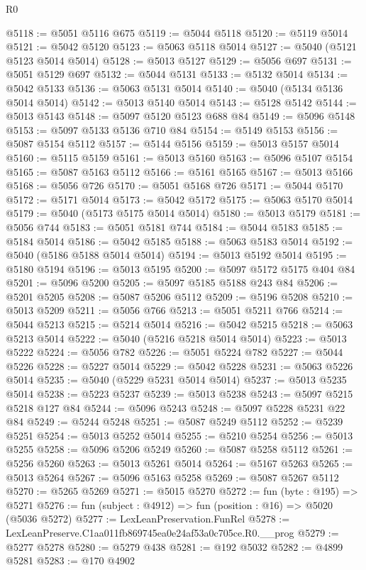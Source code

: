 \begin{lexlean}{R0}
\begin{coremodule}
@5118 := @5051 @5116 @675
@5119 := @5044 @5118
@5120 := @5119 @5014
@5121 := @5042 @5120
@5123 := @5063 @5118 @5014
@5127 := @5040 (@5121 @5123 @5014 @5014)
@5128 := @5013 @5127
@5129 := @5056 @697
@5131 := @5051 @5129 @697
@5132 := @5044 @5131
@5133 := @5132 @5014
@5134 := @5042 @5133
@5136 := @5063 @5131 @5014
@5140 := @5040 (@5134 @5136 @5014 @5014)
@5142 := @5013 @5140 @5014
@5143 := @5128 @5142
@5144 := @5013 @5143
@5148 := @5097 @5120 @5123 @688 @84
@5149 := @5096 @5148
@5153 := @5097 @5133 @5136 @710 @84
@5154 := @5149 @5153
@5156 := @5087 @5154 @5112
@5157 := @5144 @5156
@5159 := @5013 @5157 @5014
@5160 := @5115 @5159
@5161 := @5013 @5160
@5163 := @5096 @5107 @5154
@5165 := @5087 @5163 @5112
@5166 := @5161 @5165
@5167 := @5013 @5166
@5168 := @5056 @726
@5170 := @5051 @5168 @726
@5171 := @5044 @5170
@5172 := @5171 @5014
@5173 := @5042 @5172
@5175 := @5063 @5170 @5014
@5179 := @5040 (@5173 @5175 @5014 @5014)
@5180 := @5013 @5179
@5181 := @5056 @744
@5183 := @5051 @5181 @744
@5184 := @5044 @5183
@5185 := @5184 @5014
@5186 := @5042 @5185
@5188 := @5063 @5183 @5014
@5192 := @5040 (@5186 @5188 @5014 @5014)
@5194 := @5013 @5192 @5014
@5195 := @5180 @5194
@5196 := @5013 @5195
@5200 := @5097 @5172 @5175 @404 @84
@5201 := @5096 @5200
@5205 := @5097 @5185 @5188 @243 @84
@5206 := @5201 @5205
@5208 := @5087 @5206 @5112
@5209 := @5196 @5208
@5210 := @5013 @5209
@5211 := @5056 @766
@5213 := @5051 @5211 @766
@5214 := @5044 @5213
@5215 := @5214 @5014
@5216 := @5042 @5215
@5218 := @5063 @5213 @5014
@5222 := @5040 (@5216 @5218 @5014 @5014)
@5223 := @5013 @5222
@5224 := @5056 @782
@5226 := @5051 @5224 @782
@5227 := @5044 @5226
@5228 := @5227 @5014
@5229 := @5042 @5228
@5231 := @5063 @5226 @5014
@5235 := @5040 (@5229 @5231 @5014 @5014)
@5237 := @5013 @5235 @5014
@5238 := @5223 @5237
@5239 := @5013 @5238
@5243 := @5097 @5215 @5218 @127 @84
@5244 := @5096 @5243
@5248 := @5097 @5228 @5231 @22 @84
@5249 := @5244 @5248
@5251 := @5087 @5249 @5112
@5252 := @5239 @5251
@5254 := @5013 @5252 @5014
@5255 := @5210 @5254
@5256 := @5013 @5255
@5258 := @5096 @5206 @5249
@5260 := @5087 @5258 @5112
@5261 := @5256 @5260
@5263 := @5013 @5261 @5014
@5264 := @5167 @5263
@5265 := @5013 @5264
@5267 := @5096 @5163 @5258
@5269 := @5087 @5267 @5112
@5270 := @5265 @5269
@5271 := @5015 @5270
@5272 := fun (byte : @195) => @5271
@5276 := fun (subject : @4912) => fun (position : @16) => @5020 (@5036 @5272)
@5277 := LexLeanPreservation.FunRel
@5278 := LexLeanPreserve.C1aa011fb869745ea0e24af53a0c705ce.R0.__prog
@5279 := @5277 @5278
@5280 := @5279 @438
@5281 := @192 @5032
@5282 := @4899 @5281
@5283 := @170 @4902

\end{coremodule}
\end{lexlean}
